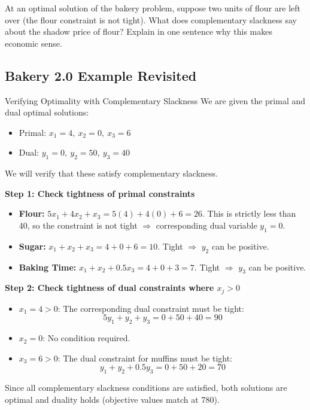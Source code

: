 \begin{learningcheckpoint}[label={lc:cs-leftover}]
At an optimal solution of the bakery problem, suppose two units of flour are left over (the flour constraint is not tight).  What does complementary slackness say about the shadow price of flour?  Explain in one sentence why this makes economic sense.
\end{learningcheckpoint}

\subsection*{Bakery 2.0 Example Revisited}

\begin{example}{Verifying Optimality with Complementary Slackness}\label{example:cs-bakery2-verify}
We are given the primal and dual optimal solutions:

\begin{itemize}
\item Primal: \( x_1 = 4,\ x_2 = 0,\ x_3 = 6 \)
\item Dual: \( y_1 = 0,\ y_2 = 50,\ y_3 = 40 \)
\end{itemize}

We will verify that these satisfy complementary slackness.

\textbf{Step 1: Check tightness of primal constraints}

\begin{itemize}
\item \textbf{Flour: } \( 5x_1 + 4x_2 + x_3 = 5(4) + 4(0) + 6 = 26 \). This is strictly less than 40, so the constraint is not tight \(\Rightarrow\) corresponding dual variable \(y_1 = 0\).
\item \textbf{Sugar: } \( x_1 + x_2 + x_3 = 4 + 0 + 6 = 10 \). Tight \(\Rightarrow\) \(y_2\) can be positive.
\item \textbf{Baking Time: } \( x_1 + x_2 + 0.5x_3 = 4 + 0 + 3 = 7 \). Tight \(\Rightarrow\) \(y_3\) can be positive.
\end{itemize}

\textbf{Step 2: Check tightness of dual constraints where \(x_j > 0\)}

\begin{itemize}
\item \(x_1 = 4 > 0\): The corresponding dual constraint must be tight:
\[
5y_1 + y_2 + y_3 = 0 + 50 + 40 = 90
\]
\item \(x_2 = 0\): No condition required.
\item \(x_3 = 6 > 0\): The dual constraint for muffins must be tight:
\[
y_1 + y_2 + 0.5y_3 = 0 + 50 + 20 = 70
\]
\end{itemize}

Since all complementary slackness conditions are satisfied, both solutions are optimal and duality holds (objective values match at 780).
\end{example}

